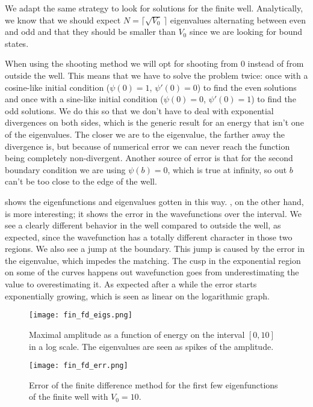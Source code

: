 \documentclass[10pt,a4paper,twocolumn]{article}
\begin{document}
We adapt the same strategy to look for solutions for the finite well. Analytically, we know that we should expect $N = \lceil \sqrt{V_0}  \,\rceil$ eigenvalues alternating between even and odd and that they should be smaller than $V_0$ since we are looking for bound states.

When using the shooting method we will opt for shooting from $0$ instead of from outside the well. This means that we have to solve the problem twice: once with a cosine-like initial condition ($\psi(0)=1$, $\psi'(0)=0$) to find the even solutions and once with a sine-like initial condition ($\psi(0)=0$, $\psi'(0)=1$) to find the odd solutions. We do this so that we don't have to deal with exponential divergences on both sides, which is the generic result for an energy that isn't one of the eigenvalues. The closer we are to the eigenvalue, the farther away the divergence is, but because of numerical error we can never reach the function being completely non-divergent. Another source of error is that for the second boundary condition we are using $\psi(b) = 0$, which is true at infinity, so out $b$ can't be too close to the edge of the well.

 shows the eigenfunctions and eigenvalues gotten in this way. , on the other hand, is more interesting; it shows the error in the wavefunctions over the interval. We see a clearly different behavior in the well compared to outside the well, as expected, since the wavefunction has a totally different character in those two regions. We also see a jump at the boundary. This jump is caused by the error in the eigenvalue, which impedes the matching. The cusp in the exponential region on some of the curves happens out wavefunction goes from underestimating the value to overestimating it. As expected after a while the error starts exponentially growing, which is seen as linear on the logarithmic graph.

\begin{figure}
    \centering
    \captionsetup{justification=centering}
    \texttt{[image: fin\_fd\_eigs.png]}
    \caption{Maximal amplitude as a function of energy on the interval $[0,10]$ in a log scale. The eigenvalues are seen as spikes of the amplitude.}
    \label{fig:fin_fd_eigs}
\end{figure}

\begin{figure}
    \centering
    \captionsetup{justification=centering}
    \texttt{[image: fin\_fd\_err.png]}
    \caption{Error of the finite difference method for the first few eigenfunctions of the finite well with $V_0 = 10$.}
    \label{fig:fin_fd_err}
\end{figure}
\end{document}
